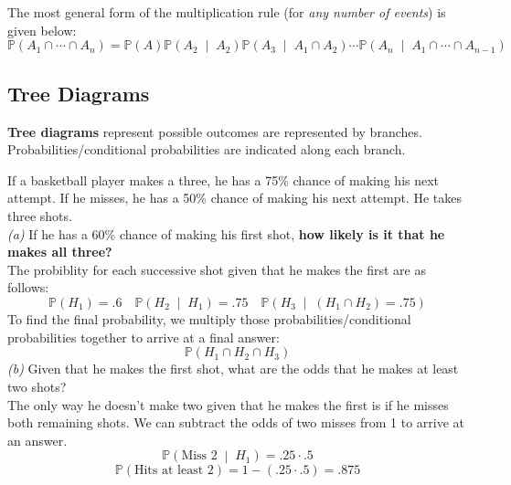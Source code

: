 \documentclass[titlepage, 12pt, leqno]{article}
\begin{document}
The most general form of the multiplication rule (for \textit{any number of events}) is given below:
\[
\boxed{\mathbb{P}(A_1 \cap \cdots \cap A_n) = \mathbb{P}(A) \mathbb{P}\left(A_2 \;\middle|\; A_2\right) \mathbb{P}\left(A_3 \;\middle|\; A_1 \cap A_2\right) \cdots \mathbb{P}\left(A_n \;\middle|\; A_1 \cap \cdots \cap A_{n-1}\right)}
\]
\pagebreak
\subsection{Tree Diagrams}
\begin{definition}
    \textbf{Tree diagrams} represent possible outcomes are represented by branches. Probabilities/conditional probabilities are indicated along each branch.
\end{definition}

\begin{ex}
    If a basketball player makes a three, he has a 75\% chance of making his next attempt. If he misses, he has a 50\% chance of making his next attempt. He takes three shots. \\
    \textit{(a)} If he has a 60\% chance of making his first shot, \textbf{how likely is it that he makes all three?}  \\
    The probiblity for each successive shot given that he makes the first are as follows:
    \[
    \mathbb{P}(H_1) = .6 \quad \mathbb{P}\left(H_2 \;\middle|\; H_1\right) = .75 \quad \mathbb{P}\left(H_3 \;\middle|\; (H_1 \cap H_2) = .75\right) 
    \]
    To find the final probability, we multiply those probabilities/conditional probabilities together to arrive at a final answer:
    \[
    \boxed{\mathbb{P}(H_1 \cap H_2 \cap H_3)} 
    \]
    \textit{(b)} Given that he makes the first shot, what are the odds that he makes at least two shots? \\
    The only way he doesn't make two given that he makes the first is if he misses both remaining shots. We can subtract the odds of two misses from 1 to arrive at an answer.
    \[
        \mathbb{P}\left(\text{Miss 2} \;\middle|\; H_1\right)  = .25 \cdot .5
    \]
    \[
        \boxed{\mathbb{P}(\text{Hits at least 2}) = 1 - (.25 \cdot .5) = .875} 
    \]
\end{ex}
\pagebreak
\end{document}
